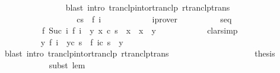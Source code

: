 \begin{isabellebody}
\ \ \ \ \ \ \ \ \ \ \ \ \ \ \isamarkupfalse%
\ {\isacharparenleft}blast\ intro{\isacharcolon}\ tranclp{\isacharunderscore}into{\isacharunderscore}rtranclp\ rtranclp{\isacharunderscore}trans{\isacharparenright}\isanewline
\ \ \ \ \ \ \ \ \ \ \isamarkupfalse%
\isanewline
\ \ \ \ \ \ \ \ \isacommand{{\isacharbraceright}}\isamarkupfalse%
\isanewline
\ \ \ \ \ \ \ \ \isamarkupfalse%
\ {\isachardoublequoteopen}{\isasymGamma}{\isasymturnstile}{\isacharparenleft}c{\isacharcomma}s{\isacharparenright}\ {\isasymrightarrow}\isactrlsup {\isacharasterisk}\ f\ i{\isachardoublequoteclose}\isanewline
\ \ \ \ \ \ \ \ \ \ \isamarkupfalse%
\ iprover\isanewline
\ \ \ \ \ \ \ \ \isamarkupfalse%
\ seq\ \isamarkupfalse%
\isanewline
\ \ \ \ \ \ \ \ \ \ {\isachardoublequoteopen}{\isacharparenleft}f\ {\isacharparenleft}Suc\ i{\isacharparenright}{\isacharcomma}\ f\ i{\isacharparenright}\ {\isasymin}\ {\isacharbraceleft}{\isacharparenleft}y{\isacharcomma}\ x{\isacharparenright}{\isachardot}\ {\isasymGamma}{\isasymturnstile}{\isacharparenleft}c{\isacharcomma}\ s{\isacharparenright}\ {\isasymrightarrow}\isactrlsup {\isacharasterisk}\ x\ {\isasymand}\ {\isasymGamma}{\isasymturnstile}x\ {\isasymrightarrow}\isactrlsup {\isacharplus}\ y{\isacharbraceright}{\isachardoublequoteclose}\isanewline
\ \ \ \ \ \ \ \ \ \ \isamarkupfalse%
\ clarsimp\isanewline
\ \ \ \ \ \ \ \ \isamarkupfalse%
\ \isanewline
\ \ \ \ \ \ \ \ \isamarkupfalse%
\ {\isachardoublequoteopen}{\isasymforall}y{\isachardot}\ {\isasymGamma}{\isasymturnstile}f\ i\ {\isasymrightarrow}\isactrlsup {\isacharplus}\ y{\isasymlongrightarrow}{\isasymGamma}{\isasymturnstile}{\isacharparenleft}c{\isacharcomma}\ s{\isacharparenright}\ {\isasymrightarrow}\isactrlsup {\isacharasterisk}\ f\ i{\isasymlongrightarrow}{\isasymGamma}{\isasymturnstile}{\isacharparenleft}c{\isacharcomma}\ s{\isacharparenright}\ {\isasymrightarrow}\isactrlsup {\isacharasterisk}\ y{\isachardoublequoteclose}\isanewline
\ \ \ \ \ \ \ \ \ \ \isamarkupfalse%
\ {\isacharparenleft}blast\ intro{\isacharcolon}\ tranclp{\isacharunderscore}into{\isacharunderscore}rtranclp\ rtranclp{\isacharunderscore}trans{\isacharparenright}\isanewline
\ \ \ \ \ \ \ \ \isamarkupfalse%
\ \isanewline
\ \ \ \ \ \ \ \ \isamarkupfalse%
\ {\isacharquery}thesis\ \isanewline
\ \ \ \ \ \ \ \ \ \ \isamarkupfalse%
\ {\isacharparenleft}subst\ lem\ {\isacharparenright}\isanewline
\ \ \ \ \ \ \isamarkupfalse%

\end{isabellebody}
